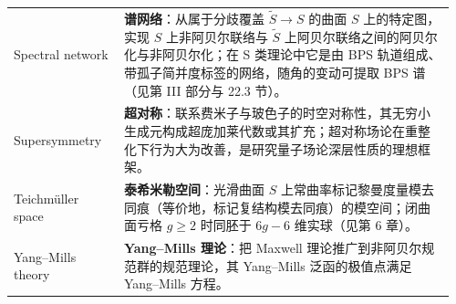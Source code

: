 \begin{longtable}{@{}p{0.24\linewidth}p{0.72\linewidth}@{}}
Spectral network & \textbf{谱网络}：从属于分歧覆盖 $\tilde S\to S$ 的曲面 $S$ 上的特定图，实现 $S$ 上非阿贝尔联络与 $\tilde S$ 上阿贝尔联络之间的阿贝尔化与非阿贝尔化；在 S 类理论中它是由 BPS 轨道组成、带孤子简并度标签的网络，随角的变动可提取 BPS 谱（见第 III 部分与 22.3 节）。 \\
Supersymmetry & \textbf{超对称}：联系费米子与玻色子的时空对称性，其无穷小生成元构成超庞加莱代数或其扩充；超对称场论在重整化下行为大为改善，是研究量子场论深层性质的理想框架。 \\
Teichmüller space & \textbf{泰希米勒空间}：光滑曲面 $S$ 上常曲率标记黎曼度量模去同痕（等价地，标记复结构模去同痕）的模空间；闭曲面亏格 $g\ge2$ 时同胚于 $6g-6$ 维实球（见第 6 章）。 \\
Yang–Mills theory & \textbf{Yang–Mills 理论}：把 Maxwell 理论推广到非阿贝尔规范群的规范理论，其 Yang–Mills 泛函的极值点满足 Yang–Mills 方程。 \\
\end{longtable}
\normalsize



